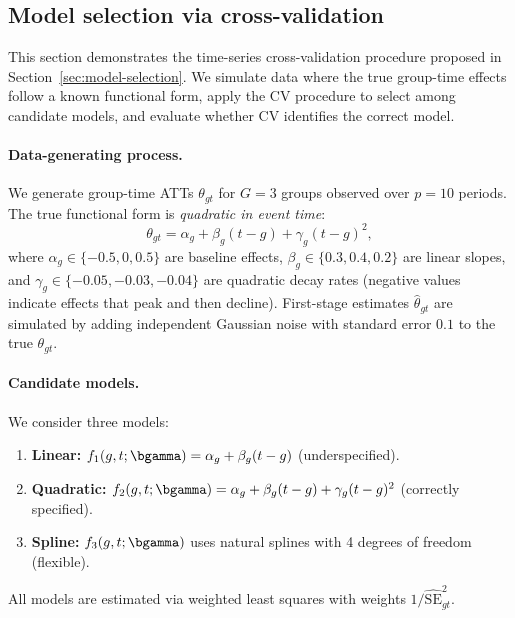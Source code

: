 \subsection{Model selection via cross-validation}\label{sec:cv-simulation}


This section demonstrates the time-series cross-validation procedure proposed in Section~\ref{sec:model-selection}. We simulate data where the true group-time effects follow a known functional form, apply the CV procedure to select among candidate models, and evaluate whether CV identifies the correct model.

\paragraph{Data-generating process.}
We generate group-time ATTs $\theta_{gt}$ for $G = 3$ groups observed over $p = 10$ periods. The true functional form is \emph{quadratic in event time}:
\[
\theta_{gt} = \alpha_g + \beta_g (t - g) + \gamma_g (t - g)^2,
\]
where $\alpha_g \in \{-0.5, 0, 0.5\}$ are baseline effects, $\beta_g \in \{0.3, 0.4, 0.2\}$ are linear slopes, and $\gamma_g \in \{-0.05, -0.03, -0.04\}$ are quadratic decay rates (negative values indicate effects that peak and then decline). First-stage estimates $\widehat{\theta}_{gt}$ are simulated by adding independent Gaussian noise with standard error $0.1$ to the true $\theta_{gt}$.

\paragraph{Candidate models.}
We consider three models:
\begin{enumerate}
    \item \textbf{Linear:} $f_1(g, t; \bgamma) = \alpha_g + \beta_g (t - g)$ (underspecified).
    \item \textbf{Quadratic:} $f_2(g, t; \bgamma) = \alpha_g + \beta_g (t - g) + \gamma_g (t - g)^2$ (correctly specified).
    \item \textbf{Spline:} $f_3(g, t; \bgamma)$ uses natural splines with 4 degrees of freedom (flexible).
\end{enumerate}

All models are estimated via weighted least squares with weights $1 / \widehat{\text{SE}}_{gt}^2$.

